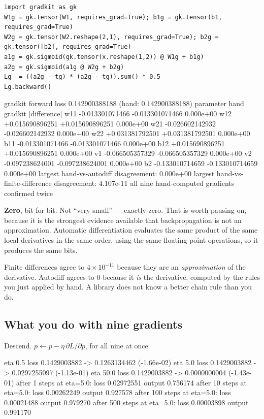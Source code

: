 \documentclass[11pt]{article}
\begin{document}
\begin{lstlisting}
import gradkit as gk
W1g = gk.tensor(W1, requires_grad=True); b1g = gk.tensor(b1, requires_grad=True)
W2g = gk.tensor(W2.reshape(2,1), requires_grad=True); b2g = gk.tensor([b2], requires_grad=True)
a1g = gk.sigmoid(gk.tensor(x.reshape(1,2)) @ W1g + b1g)
a2g = gk.sigmoid(a1g @ W2g + b2g)
Lg  = ((a2g - tg) * (a2g - tg)).sum() * 0.5
Lg.backward()
\end{lstlisting}
\begin{codeout}
gradkit forward loss  0.142900388188   (hand: 0.142900388188)
parameter    hand            gradkit          |difference|
   w11    -0.013301071466   -0.013301071466    0.000e+00
   w12    +0.015690896251   +0.015690896251    0.000e+00
   w21    -0.026602142932   -0.026602142932    0.000e+00
   w22    +0.031381792501   +0.031381792501    0.000e+00
   b11    -0.013301071466   -0.013301071466    0.000e+00
   b12    +0.015690896251   +0.015690896251    0.000e+00
   v1     -0.066505357329   -0.066505357329    0.000e+00
   v2     -0.097238624001   -0.097238624001    0.000e+00
   b2     -0.133010714659   -0.133010714659    0.000e+00
largest hand-vs-autodiff disagreement: 0.000e+00
largest hand-vs-finite-difference disagreement: 4.107e-11
all nine hand-computed gradients confirmed twice
\end{codeout}

\textbf{Zero}, bit for bit. Not ``very small'' --- exactly zero. That is worth
pausing on, because it is the strongest evidence available that
backpropagation is not an approximation. Automatic differentiation evaluates
the same product of the same local derivatives in the same order, using the
same floating-point operations, so it produces the same bits.

\begin{keyidea}
Finite differences agree to $4\times10^{-11}$ because they are an
\emph{approximation} of the derivative. Autodiff agrees to $0$ because it
\emph{is} the derivative, computed by the rules you just applied by hand. A
library does not know a better chain rule than you do.
\end{keyidea}

\subsection{What you do with nine gradients}

Descend. $p \leftarrow p - \eta\,\partial L/\partial p$, for all nine at once.

\begin{codeout}
   eta   0.5   loss 0.1429003882 -> 0.1263134462   (-1.66e-02)
   eta   5.0   loss 0.1429003882 -> 0.0297255097   (-1.13e-01)
   eta  50.0   loss 0.1429003882 -> 0.0000000004   (-1.43e-01)
   after   1 steps at eta=5.0: loss 0.02972551  output 0.756174
   after  10 steps at eta=5.0: loss 0.00262249  output 0.927578
   after 100 steps at eta=5.0: loss 0.00021488  output 0.979270
   after 500 steps at eta=5.0: loss 0.00003898  output 0.991170
\end{codeout}
\end{document}
